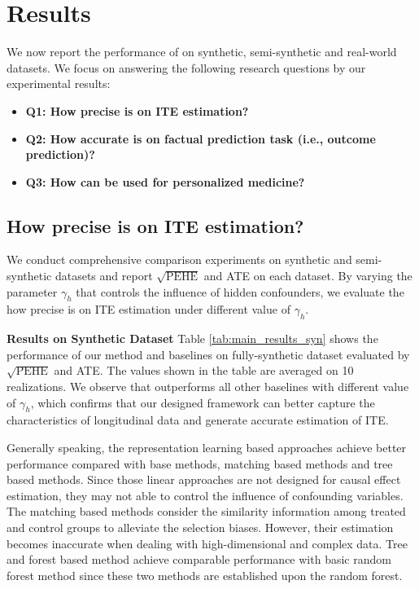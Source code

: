 \section{Results}
We now report the performance of \model on synthetic, semi-synthetic and real-world datasets. We focus on answering the following research questions by our experimental results:
\begin{itemize}[leftmargin=*]
    \item \textbf{Q1: How precise is \model on ITE estimation?}
    \item \textbf{Q2: How accurate is \model on factual prediction task (i.e., outcome prediction)?}
    \item \textbf{Q3: How can \model be used for personalized medicine?}
\end{itemize}

\subsection{How precise is \model on ITE estimation?}
We conduct comprehensive comparison experiments on synthetic and  semi-synthetic datasets and report $\sqrt{\text{PEHE}}$ and ATE on each dataset. By varying the parameter $\gamma_{h}$ that controls the influence of hidden confounders, we evaluate the how precise is \model on ITE estimation under different value of $\gamma_{h}$. 

\noindent\textbf{Results on Synthetic Dataset}
Table \ref{tab:main_results_syn} shows the performance of our method and baselines on fully-synthetic dataset evaluated by $\sqrt{\text{PEHE}}$ and ATE. The values shown in the table are averaged on 10 realizations. We observe that \model outperforms all other baselines with different value of $\gamma_{h}$, which confirms that our designed framework can better capture the characteristics of longitudinal data and generate accurate estimation of ITE. 

Generally speaking, the representation learning based approaches achieve better performance compared with base methods, matching based methods and tree based methods. Since those linear approaches are not designed for causal effect estimation, they may not able to control the influence of confounding variables. The matching based methods consider the similarity information among treated and control groups to alleviate the selection biases. However, their estimation becomes inaccurate when dealing with high-dimensional and complex data. Tree and forest based method achieve comparable performance with basic random forest method since these two methods are established upon the random forest.

